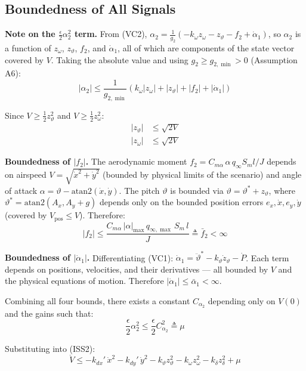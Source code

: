 \documentclass[11pt,a4paper]{article}
\theoremstyle{plain}
\theoremstyle{remark}
\newcommand{\vth}{\vartheta}
\newcommand{\vths}{\vartheta^*}
\newcommand{\zth}{z_{\vth}}
\newcommand{\zom}{z_{\omega}}
\newcommand{\zdel}{z_{\delta}}
\begin{document}
\subsection{Boundedness of All Signals}
\label{sec:uub}

\textbf{Note on the $\tfrac{\epsilon}{2}\alpha_2^2$ term.} From (VC2), $\alpha_2 = \tfrac{1}{g_2}(-k_\omega\zom - \zth - f_2 + \dot\alpha_1)$, so $\alpha_2$ is a function of $\zom$, $\zth$, $f_2$, and $\dot\alpha_1$, all of which are components of the state vector covered by $V$. Taking the absolute value and using $g_2 \geq g_{2,\min} > 0$ (Assumption A6):
\[
  |\alpha_2| \leq \frac{1}{g_{2,\min}}\!\left(k_\omega|\zom| + |\zth| + |f_2| + |\dot\alpha_1|\right)
\]

Since $V \geq \tfrac{1}{2}\zth^2$ and $V \geq \tfrac{1}{2}\zom^2$:
\begin{align}
  |\zth| &\leq \sqrt{2V} \\
  |\zom| &\leq \sqrt{2V}
\end{align}

\textbf{Boundedness of $|f_2|$.} The aerodynamic moment $f_2 = C_{m\alpha}\,\alpha\,q_\infty S_m l/J$ depends on airspeed $V = \sqrt{\dot x^2 + \dot y^2}$ (bounded by physical limits of the scenario) and angle of attack $\alpha = \vth - \mathrm{atan2}(\dot x, \dot y)$. The pitch $\vth$ is bounded via $\vth = \vths + \zth$, where $\vths = \mathrm{atan2}(A_x, A_y+g)$ depends only on the bounded position errors $e_x, \dot x, e_y, \dot y$ (covered by $V_\mathrm{pos} \leq V$). Therefore:
\[
  |f_2| \leq \frac{C_{m\alpha}\,|\alpha|_{\max}\,q_{\infty,\max}\,S_m\,l}{J} \triangleq \bar f_2 < \infty
\]

\textbf{Boundedness of $|\dot\alpha_1|$.} Differentiating (VC1): $\dot\alpha_1 = \ddot\vths - k_\vth\dot\zth - \dot P$. Each term depends on positions, velocities, and their derivatives --- all bounded by $V$ and the physical equations of motion. Therefore $|\dot\alpha_1| \leq \bar\alpha_1 < \infty$.

Combining all four bounds, there exists a constant $C_{\alpha_2}$ depending only on $V(0)$ and the gains such that:
\[
  \frac{\epsilon}{2}\alpha_2^2 \leq \frac{\epsilon}{2}C_{\alpha_2}^2 \triangleq \mu
\]

Substituting into (ISS2):
\begin{equation}
  \dot V \leq -k_{dx}'\,\dot x^2 - k_{dy}'\,\dot y^2 - k_\vth \zth^2 - k_\omega\zom^2 - k_\delta\zdel^2 + \mu
  \tag{ISS3}
\end{equation}
\end{document}
